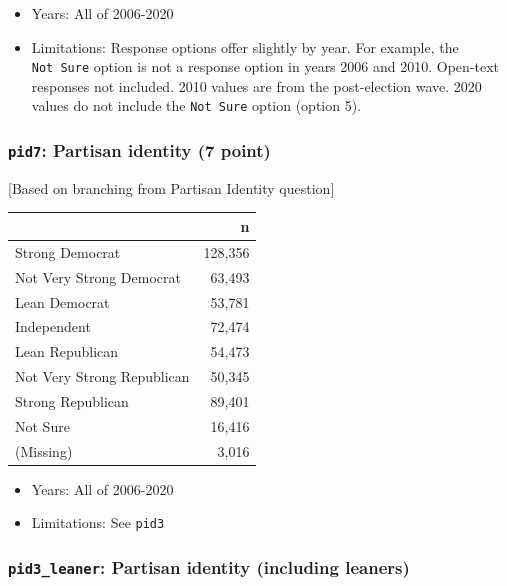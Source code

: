 \documentclass[10pt,article,oneside]{memoir}
\theoremstyle{definition}
\begin{document}
\begin{itemize}
\tightlist
\item
  Years: All of 2006-2020
\item
  Limitations: Response options offer slightly by year. For example, the
  \texttt{Not\ Sure} option is not a response option in years 2006 and
  2010. Open-text responses not included. 2010 values are from the
  post-election wave. 2020 values do not include the \texttt{Not\ Sure}
  option (option 5).
\end{itemize}

\hypertarget{pid7-partisan-identity-7-point}{%
\subsubsection{\texorpdfstring{\texttt{pid7}: Partisan identity (7
point)}{pid7: Partisan identity (7 point)}}\label{pid7-partisan-identity-7-point}}

{[}Based on branching from Partisan Identity question{]}

\begin{table}[H]
\centering
\begin{tabular}[t]{lr}
\toprule
 & n\\
\midrule
Strong Democrat & 128,356\\
Not Very Strong Democrat & 63,493\\
Lean Democrat & 53,781\\
Independent & 72,474\\
Lean Republican & 54,473\\
Not Very Strong Republican & 50,345\\
Strong Republican & 89,401\\
Not Sure & 16,416\\
(Missing) & 3,016\\
\bottomrule
\end{tabular}
\end{table}

\begin{itemize}
\tightlist
\item
  Years: All of 2006-2020
\item
  Limitations: See \texttt{pid3}
\end{itemize}

\hypertarget{pid3_leaner-partisan-identity-including-leaners}{%
\subsubsection{\texorpdfstring{\texttt{pid3\_leaner}: Partisan identity
(including
leaners)}{pid3\_leaner: Partisan identity (including leaners)}}\label{pid3_leaner-partisan-identity-including-leaners}}
\end{document}
